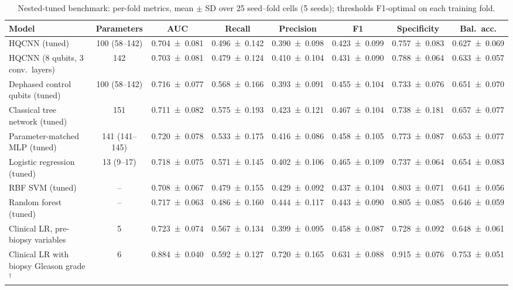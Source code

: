 \begin{table}[tbp]
\centering
\caption{Nested-tuned benchmark: per-fold metrics, mean $\pm$ SD over 25 seed--fold cells (5 seeds); thresholds F1-optimal on each training fold.}
\label{tab:s_p3_cv}
\scriptsize\setlength{\tabcolsep}{3pt}
\begin{tabular}{>{\raggedright\arraybackslash}p{3.6cm}ccccccc}
\toprule
Model & Parameters & AUC & Recall & Precision & F1 & Specificity & Bal.\ acc. \\
\midrule
HQCNN (tuned) & \num{100} (\num{58}--\num{142}) & \num{0.704 \pm 0.081} & \num{0.496 \pm 0.142} & \num{0.390 \pm 0.098} & \num{0.423 \pm 0.099} & \num{0.757 \pm 0.083} & \num{0.627 \pm 0.069} \\
HQCNN (8 qubits, 3 conv.\ layers) & \num{142} & \num{0.703 \pm 0.081} & \num{0.479 \pm 0.124} & \num{0.410 \pm 0.104} & \num{0.431 \pm 0.090} & \num{0.788 \pm 0.064} & \num{0.633 \pm 0.057} \\
Dephased control qubits (tuned) & \num{100} (\num{58}--\num{142}) & \num{0.716 \pm 0.077} & \num{0.568 \pm 0.166} & \num{0.393 \pm 0.091} & \num{0.455 \pm 0.104} & \num{0.733 \pm 0.076} & \num{0.651 \pm 0.070} \\
Classical tree network (tuned) & \num{151} & \num{0.711 \pm 0.082} & \num{0.575 \pm 0.193} & \num{0.423 \pm 0.121} & \num{0.467 \pm 0.104} & \num{0.738 \pm 0.181} & \num{0.657 \pm 0.077} \\
Parameter-matched MLP (tuned) & \num{141} (\num{141}--\num{145}) & \num{0.720 \pm 0.078} & \num{0.533 \pm 0.175} & \num{0.416 \pm 0.086} & \num{0.458 \pm 0.105} & \num{0.773 \pm 0.087} & \num{0.653 \pm 0.077} \\
Logistic regression (tuned) & \num{13} (\num{9}--\num{17}) & \num{0.718 \pm 0.075} & \num{0.571 \pm 0.145} & \num{0.402 \pm 0.106} & \num{0.465 \pm 0.109} & \num{0.737 \pm 0.064} & \num{0.654 \pm 0.083} \\
RBF SVM (tuned) & -- & \num{0.708 \pm 0.067} & \num{0.479 \pm 0.155} & \num{0.429 \pm 0.092} & \num{0.437 \pm 0.104} & \num{0.803 \pm 0.071} & \num{0.641 \pm 0.056} \\
Random forest (tuned) & -- & \num{0.717 \pm 0.063} & \num{0.486 \pm 0.160} & \num{0.444 \pm 0.117} & \num{0.443 \pm 0.090} & \num{0.805 \pm 0.085} & \num{0.646 \pm 0.059} \\
Clinical LR, pre-biopsy variables & \num{5} & \num{0.723 \pm 0.074} & \num{0.567 \pm 0.134} & \num{0.399 \pm 0.095} & \num{0.458 \pm 0.087} & \num{0.728 \pm 0.092} & \num{0.648 \pm 0.061} \\
Clinical LR with biopsy Gleason grade$^{\dagger}$ & \num{6} & \num{0.884 \pm 0.040} & \num{0.592 \pm 0.127} & \num{0.720 \pm 0.165} & \num{0.631 \pm 0.088} & \num{0.915 \pm 0.076} & \num{0.753 \pm 0.051} \\
\bottomrule
\end{tabular}
\par{}
\end{table}

